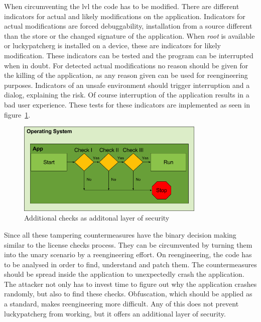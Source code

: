 When circumventing the \gls{lvl} the code has to be modified.
There are different indicators for actual and likely modifications on the application.
Indicators for actual modifications are forced debuggability, installation from a source different than the store or the changed signature of the application.
When \textit{root} is available or \gls{luckypatcherg} is installed on a device, these are indicators for likely modification.
\newline
These indicators can be tested and the program can be interrupted when in doubt.
For detected actual modifications no reason should be given for the killing of the application, as any reason given can be used for reengineering purposes.
Indicators of an unsafe environment should trigger interruption and a dialog, explaining the risk.
Of course interruption of the application results in a bad user experience.
\newline
These tests for these indicators are implemented as seen in figure~\ref{fig:verificationNowAdditional}.
\begin{figure}[h]
    \centering
    \includegraphics[width=0.8\textwidth]{data/verificationNowAdditional.png}
    \caption{Additional checks as additonal layer of security}
    \label{fig:verificationNowAdditional}
\end{figure}
Since all these tampering countermeasures have the binary decision making similar to the license checks process.
They can be circumvented by turning them into the unary scenario by a reengineering effort.
\newline
On reengineering, the code has to be analysed in order to find, understand and patch them.
The countermeasures should be spread inside the application to unexpectedly crash the application.
The attacker not only has to invest time to figure out why the application crashes randomly, but also to find these checks.
Obfuscation, which should be applied as a standard, makes reengineering more difficult.
\newline
Any of this does not prevent \gls{luckypatcherg} from working, but it offers an additional layer of security.
